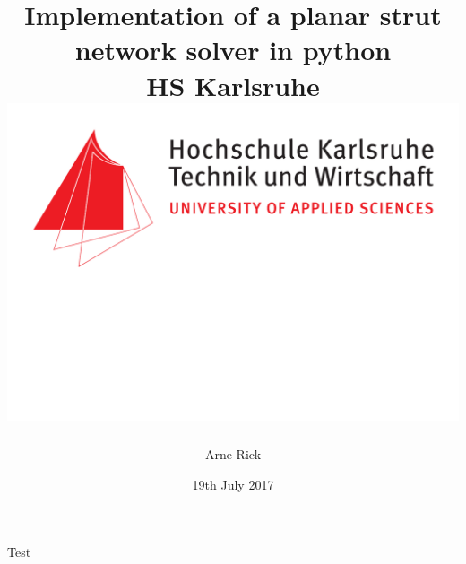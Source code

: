 \documentclass[12pt]{report}
\title{
	{Implementation of a planar strut network solver in python}\\
	{\large HS Karlsruhe}\\
	{\includegraphics{hska_logo.pdf}}
}
\author{Arne Rick}
\date{19th July 2017}
\begin{document}
Test
\end{document}
